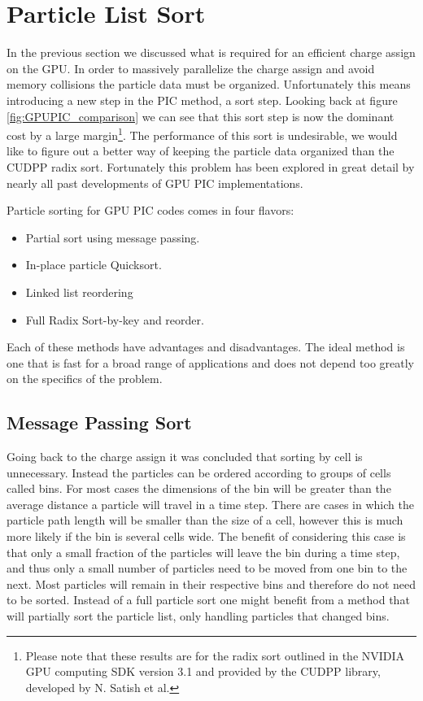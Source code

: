 	\section{Particle List Sort}
	\label{sec:plist_sort_design}
		In the previous section we discussed what is required for an efficient charge assign on the GPU. In order to massively parallelize the charge assign and avoid memory collisions the particle data must be organized. Unfortunately this means introducing a new step in the PIC method, a sort step. Looking back at figure \ref{fig:GPUPIC_comparison} we can see that this sort step is now the dominant cost by a large margin\footnote{Please note that these results are for the radix sort outlined in the NVIDIA GPU computing SDK version 3.1 and provided by the CUDPP library, developed by N. Satish et al.\cite{Satish2009}}. The performance of this sort is undesirable, we would like to figure out a better way of keeping the particle data organized than the CUDPP radix sort. Fortunately this problem has been explored in great detail by nearly all past developments of GPU PIC implementations. 

Particle sorting for GPU PIC codes comes in four flavors:
\begin{itemize}
\item Partial sort using message passing. \cite{Kong2011}\cite{Decyk2011}
\item In-place particle Quicksort. \cite{Stantchev2008}
\item Linked list reordering \cite{Burau2010}
\item Full Radix Sort-by-key and reorder. \cite{Abreu2011}
\end{itemize}
Each of these methods have advantages and disadvantages. The ideal method is one that is fast for a broad range of applications and does not depend too greatly on the specifics of the problem.



	\subsection{Message Passing Sort}
	Going back to the charge assign it was concluded that sorting by cell is unnecessary. Instead the particles can be ordered according to groups of cells called bins. For most cases the dimensions of the bin will be greater than the average distance a particle will travel in a time step. There are cases in which the particle path length will be smaller than the size of a cell, however this is much more likely if the bin is several cells wide. The benefit of considering this case is that only a small fraction of the particles will leave the bin during a time step, and thus only a small number of particles need to be moved from one bin to the next. Most particles will remain in their respective bins and therefore do not need to be sorted. Instead of a full particle sort one might benefit from a method that will partially sort the particle list, only handling particles that changed bins. 

